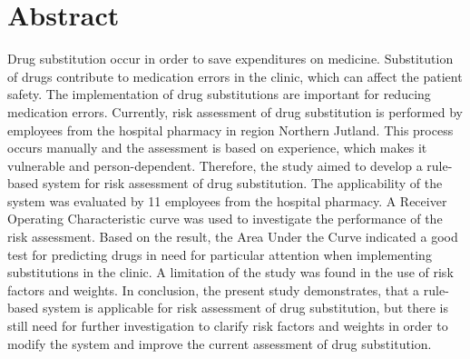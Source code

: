 \chapter*{Abstract}
Drug substitution occur in order to save expenditures on medicine. Substitution of drugs contribute to medication errors in the clinic, which can affect the patient safety. The implementation of drug substitutions are important for reducing medication errors. Currently, risk assessment of drug substitution is performed by employees from the hospital pharmacy in region Northern Jutland. This process occurs manually and the assessment is based on experience, which makes it vulnerable and person-dependent. Therefore, the study aimed to develop a rule-based system for risk assessment of drug substitution. The applicability of the system was evaluated by 11 employees from the hospital pharmacy. A Receiver Operating Characteristic curve was used to investigate the performance of the risk assessment. Based on the result, the Area Under the Curve indicated a good test for predicting drugs in need for particular attention when implementing substitutions in the clinic. A limitation of the study was found in the use of risk factors and weights. In conclusion, the present study demonstrates, that a rule-based system is applicable for risk assessment of drug substitution, but there is still need for further investigation to clarify risk factors and weights in order to modify the system and improve the current assessment of drug substitution.  
